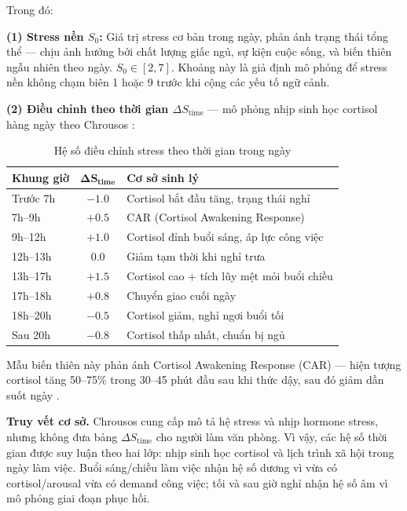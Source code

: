 Trong đó:

\textbf{(1) Stress nền $S_0$:} Giá trị stress cơ bản trong ngày, phản ánh trạng thái tổng thể — chịu ảnh hưởng bởi chất lượng giấc ngủ, sự kiện cuộc sống, và biến thiên ngẫu nhiên theo ngày. $S_0 \in [2, 7]$. Khoảng này là giả định mô phỏng để stress nền không chạm biên 1 hoặc 9 trước khi cộng các yếu tố ngữ cảnh.

\textbf{(2) Điều chỉnh theo thời gian $\Delta S_{\text{time}}$} — mô phỏng nhịp sinh học cortisol hàng ngày theo Chrousos \cite{chrousos2009stress}:

\begin{table}[H]
\centering
\caption{Hệ số điều chỉnh stress theo thời gian trong ngày}
\label{tab:time_stress_modifier}
\begin{tabular}{|l|c|l|}
\hline
\textbf{Khung giờ} & $\boldsymbol{\Delta S_{\text{time}}}$ & \textbf{Cơ sở sinh lý} \\
\hline
Trước 7h   & $-1.0$ & Cortisol bắt đầu tăng, trạng thái nghỉ \\
7h--9h     & $+0.5$ & CAR (Cortisol Awakening Response) \\
9h--12h    & $+1.0$ & Cortisol đỉnh buổi sáng, áp lực công việc \\
12h--13h   & $0.0$  & Giảm tạm thời khi nghỉ trưa \\
13h--17h   & $+1.5$ & Cortisol cao + tích lũy mệt mỏi buổi chiều \\
17h--18h   & $+0.8$ & Chuyển giao cuối ngày \\
18h--20h   & $-0.5$ & Cortisol giảm, nghỉ ngơi buổi tối \\
Sau 20h    & $-0.8$ & Cortisol thấp nhất, chuẩn bị ngủ \\
\hline
\end{tabular}
\end{table}

Mẫu biến thiên này phản ánh Cortisol Awakening Response (CAR) — hiện tượng cortisol tăng 50--75\% trong 30--45 phút đầu sau khi thức dậy, sau đó giảm dần suốt ngày \cite{chrousos2009stress}.

\textbf{Truy vết cơ sở.} Chrousos cung cấp mô tả hệ stress và nhịp hormone stress, nhưng không đưa bảng $\Delta S_{\text{time}}$ cho người làm văn phòng. Vì vậy, các hệ số thời gian được suy luận theo hai lớp: nhịp sinh học cortisol và lịch trình xã hội trong ngày làm việc. Buổi sáng/chiều làm việc nhận hệ số dương vì vừa có cortisol/arousal vừa có demand công việc; tối và sau giờ nghỉ nhận hệ số âm vì mô phỏng giai đoạn phục hồi.

